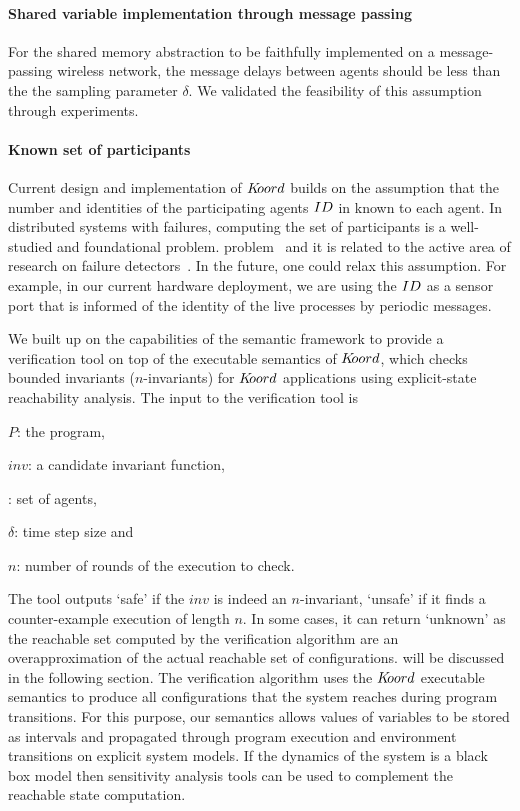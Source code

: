 \paragraph*{Shared variable implementation through message passing}
For the shared memory abstraction to be faithfully implemented on a message-passing wireless network, the message delays between agents should be less than the the sampling parameter $\delta$. We validated the feasibility of this assumption through experiments.

\paragraph*{Known set of participants}
Current design and implementation of $K\kern-2pt oord$ builds on the assumption that the number and identities of the participating agents $ID$ in known to each agent. In distributed systems with failures, computing the set of participants is a well-studied and foundational problem. problem~\cite{AlistarhAGG2011} and it is related to the active area of research on failure detectors~\cite{Chandra:1996,delporte2004weakest}. In the future, one could  relax this  assumption. For example, in our current hardware deployment, we are using the $ID$ as a sensor port that is informed of the identity of the live processes by periodic messages. 


We built up on the capabilities of the \K semantic framework to provide a verification tool on top of the executable semantics of $K\kern-2pt oord$, which checks bounded invariants ($n$-invariants) for $K\kern-2pt oord$ applications using explicit-state reachability analysis. The input to the verification tool is 
\begin{inparaenum}[(i)] 
    \item $P$: the program, 
    \item $\mathit{inv}$: a candidate invariant function, 
    \item {\UINS}: set of agents, 
    \item $\delta$: time step size and 
    \item $n$: number of rounds of the execution to check.
\end{inparaenum}

The tool outputs `safe' if the $\mathit{inv}$ is indeed an $n$-invariant, `unsafe' if it finds a counter-example execution of length $n$. In some cases, it can return `unknown' as the reachable set computed by the verification algorithm are an overapproximation of the actual reachable set of configurations.  will be discussed in the following section.  
%
The verification algorithm uses the $K\kern-2pt oord$ executable semantics to produce all configurations that the system reaches during program transitions. For this purpose, our semantics allows values of variables to be stored as intervals and propagated through program execution and environment transitions on explicit system models. If the dynamics of the system is a black box model then sensitivity analysis tools can be used to complement the reachable state computation.  

